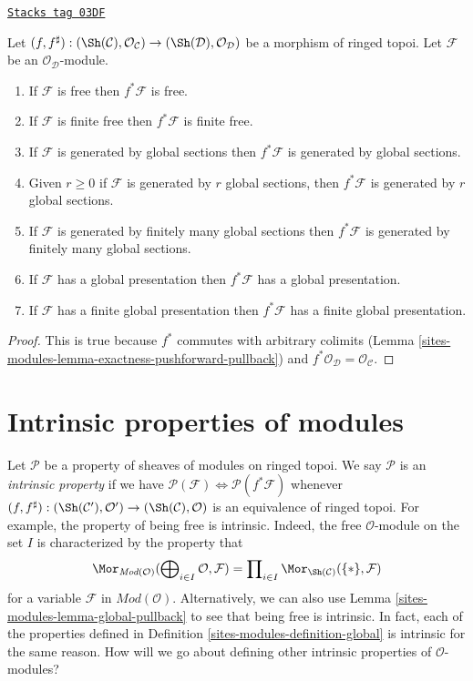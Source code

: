 \begin{lemma}
\label{sites-modules-lemma-global-pullback}
\href{https://stacks.math.columbia.edu/tag/03DF}{\texttt{Stacks tag 03DF}}

Let
$(f, f^\sharp) :
(\Sh(\mathcal{C}), \mathcal{O}_\mathcal{C})
\to
(\Sh(\mathcal{D}), \mathcal{O}_\mathcal{D})$
be a morphism of ringed topoi.
Let $\mathcal{F}$ be an $\mathcal{O}_\mathcal{D}$-module.
\begin{enumerate}
\item If $\mathcal{F}$ is free then $f^*\mathcal{F}$ is free.
\item If $\mathcal{F}$ is finite free then $f^*\mathcal{F}$ is finite free.
\item If $\mathcal{F}$ is generated by global sections
then $f^*\mathcal{F}$ is generated by global sections.
\item Given $r \geq 0$ if $\mathcal{F}$ is generated by $r$ global
sections, then $f^*\mathcal{F}$ is generated by $r$ global sections.
\item If $\mathcal{F}$ is generated by finitely many global sections
then $f^*\mathcal{F}$ is generated by finitely many global sections.
\item If $\mathcal{F}$ has a global presentation then
$f^*\mathcal{F}$ has a global presentation.
\item If $\mathcal{F}$ has a finite global presentation
then $f^*\mathcal{F}$ has a finite global presentation.
\end{enumerate}
\end{lemma}

\begin{proof}
This is true because $f^*$ commutes with arbitrary colimits
(Lemma \ref{sites-modules-lemma-exactness-pushforward-pullback})
and $f^*\mathcal{O}_\mathcal{D} = \mathcal{O}_\mathcal{C}$.
\end{proof}

\section{Intrinsic properties of modules}
\label{sites-modules-section-intrinsic}
Let $\mathcal{P}$ be a property of sheaves of modules on ringed topoi.
We say $\mathcal{P}$ is an {\it intrinsic property} if we have
$\mathcal{P}(\mathcal{F}) \Leftrightarrow \mathcal{P}(f^*\mathcal{F})$
whenever $(f, f^\sharp) :
(\Sh(\mathcal{C}'), \mathcal{O}')
\to
(\Sh(\mathcal{C}), \mathcal{O})$
is an equivalence of ringed topoi.
For example, the property of being free is intrinsic. Indeed, the free
$\mathcal{O}$-module on the set $I$ is characterized by the property
that
$$
\Mor_{\textit{Mod}(\mathcal{O})}(
\bigoplus\nolimits_{i \in I} \mathcal{O},
\mathcal{F})
=
\prod\nolimits_{i \in I} \Mor_{\Sh(\mathcal{C})}(\{*\},
\mathcal{F})
$$
for a variable $\mathcal{F}$ in $\textit{Mod}(\mathcal{O})$.
Alternatively, we can also use Lemma \ref{sites-modules-lemma-global-pullback}
to see that being free is intrinsic. In fact, each of the properties
defined in Definition \ref{sites-modules-definition-global} is intrinsic for the
same reason.
How will we go about defining other intrinsic properties of
$\mathcal{O}$-modules?

